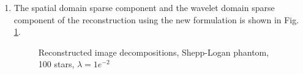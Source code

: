 \begin{enumerate}
\item The spatial domain sparse component and the wavelet domain sparse component of the reconstruction using the new formulation is shown in Fig. \ref{fig:expt47}.
\begin{figure}[t!]
\hspace{0.4in}
\hspace{0.2in}
\caption [Reconstructed image decompositions, Shepp-Logan phantom, 100 stars, $\lambda = 1e^{-2}$ ]{Reconstructed image decompositions, Shepp-Logan phantom, 100 stars, $\lambda = 1e^{-2}$}
\label{fig:expt47}
\end{figure}
\end{enumerate}


